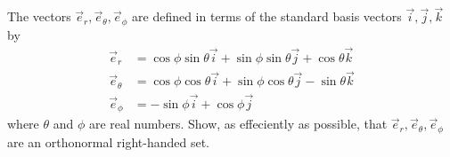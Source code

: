 \documentclass[12pt]{article}
\begin{document}
    \begin{question}
        The vectors $\vec{e}_r, \vec{e}_\theta, \vec{e}_\phi$ are defined
        in terms of the standard basis vectors $\vec{i},\vec{j},\vec{k}$ by
        \begin{align*}
            \vec{e}_r &= \cos\phi\sin\theta\vec{i}+\sin\phi\sin\theta\vec{j}+\cos\theta\vec{k}\\
            \vec{e}_\theta &= \cos\phi\cos\theta\vec{i}+\sin\phi\cos\theta\vec{j}-\sin\theta\vec{k}\\
            \vec{e}_\phi &= -\sin\phi\vec{i}+\cos\phi\vec{j}
        \end{align*}
        where $\theta$ and $\phi$ are real numbers. Show,
        as effeciently as possible, that $\vec{e}_r, \vec{e}_\theta, \vec{e}_\phi$
        are an orthonormal right-handed set.
    \end{question}
\end{document}
